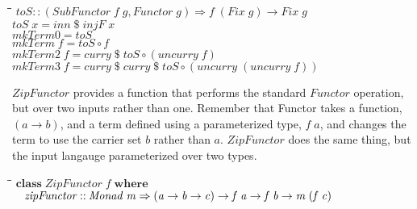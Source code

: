 \documentclass[10pt]{article}
\newlength{\lwidth}\setlength{\lwidth}{4.5cm}
\newlength{\cwidth}\setlength{\cwidth}{8mm} %
\newcommand{\Conid}[1]{\mathit{#1}}
\newcommand{\Varid}[1]{\mathit{#1}}
\begin{document}
\begin{tabbing}
\qquad\=\hspace{\lwidth}\=\hspace{\cwidth}\=\+\kill
${\Varid{toS}\mathbin{::}(\Conid{SubFunctor}\;\Varid{f}\;\Varid{g},\Conid{Functor}\;\Varid{g})\Rightarrow \Varid{f}\;(\Conid{Fix}\;\Varid{g})\to \Conid{Fix}\;\Varid{g}}$\\
${\Varid{toS}\;\Varid{x}\mathrel{=}\Varid{inn}\mathbin{\$}\Varid{injF}\;\Varid{x}}$\\
${}$\\
${\Varid{mkTerm0}\mathrel{=}\Varid{toS}}$\\
${\Varid{mkTerm}\;\Varid{f}\mathrel{=}\Varid{toS}\mathbin{\circ}\Varid{f}}$\\
${\Varid{mkTerm2}\;\Varid{f}\mathrel{=}\Varid{curry}\mathbin{\$}\Varid{toS}\mathbin{\circ}(\Varid{uncurry}\;\Varid{f})}$\\
${\Varid{mkTerm3}\;\Varid{f}\mathrel{=}\Varid{curry}\mathbin{\$}\Varid{curry}\mathbin{\$}\Varid{toS}\mathbin{\circ}(\Varid{uncurry}\;(\Varid{uncurry}\;\Varid{f}))}$
\end{tabbing}
\ensuremath{\Conid{ZipFunctor}} provides a function that performs the standard \ensuremath{\Conid{Functor}}
operation, but over two inputs rather than one.  Remember that Functor
takes a function, \ensuremath{(\Varid{a}\to \Varid{b})}, and a term defined using a parameterized
type, \ensuremath{\Varid{f}\;\Varid{a}}, and changes the term to use the carrier set \ensuremath{\Varid{b}} rather
than \ensuremath{\Varid{a}}.  \ensuremath{\Conid{ZipFunctor}} does the same thing, but the input langauge
parameterized over two types.

\begin{tabbing}
\qquad\=\hspace{\lwidth}\=\hspace{\cwidth}\=\+\kill
${\mathbf{class}\;\Conid{ZipFunctor}\;\Varid{f}\;\mathbf{where}}$\\
${\hskip1.00em\relax\Varid{zipFunctor}\mathbin{::}\Conid{Monad}\;\Varid{m}\Rightarrow (\Varid{a}\to \Varid{b}\to \Varid{c})\to \Varid{f}\;\Varid{a}\to \Varid{f}\;\Varid{b}\to \Varid{m}\;(\Varid{f}\;\Varid{c})}$
\end{tabbing}
\end{document}
